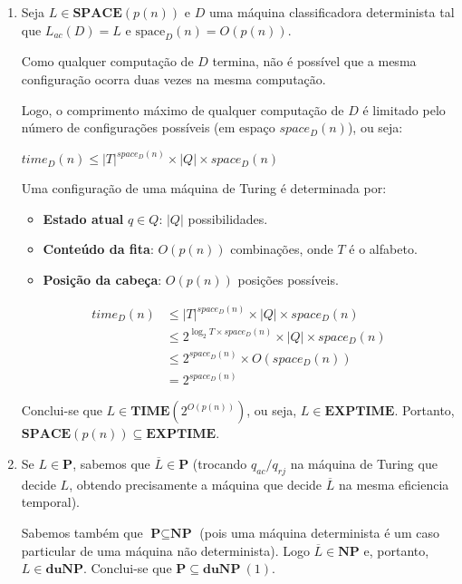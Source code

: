 \documentclass[a4paper,12pt]{article}
\begin{document}
\begin{enumerate}[label=\alph*)]
  \vspace{0.5cm}
  \item 
  Seja $L \in \textbf{SPACE}(p(n))$ e $D$ uma máquina classificadora determinista tal que $L_{ac}(D) = L$ e $\text{space}_D(n) = O(p(n))$.

  \vspace{0.3cm}
  Como qualquer computação de $D$ termina, não é possível que a mesma configuração ocorra duas vezes na mesma computação.

  \vspace{0.3cm}
  Logo, o comprimento máximo de qualquer computação de $D$ é limitado pelo número de configurações possíveis (em espaço $space_D(n)$), ou seja:
  \begin{center}
      $time_D(n) \leq |T|^{space_D(n)} \times |Q| \times space_D(n)$
  \end{center}
  Uma configuração de uma máquina de Turing é determinada por:

  \begin{itemize}
    \item \textbf{Estado atual} $ q \in Q $: $ |Q| $ possibilidades.
    \item \textbf{Conteúdo da fita}: $ O(p(n)) $ combinações, onde $ T $ é o alfabeto.
    \item \textbf{Posição da cabeça}: $ O(p(n)) $ posições possíveis.
  \end{itemize}

  \begin{align*}
    time_D(n) &\leq |T|^{space_D(n)} \times |Q| \times space_D(n) \\
    &\leq 2^{\log_2T \times space_D(n)} \times |Q| \times space_D(n) \\
    &\leq 2^{space_D(n)} \times O(space_D(n)) \\
    &= 2^{space_D(n)}
  \end{align*}

  Conclui-se que $L \in \textbf{TIME}(2^{O(p(n))})$, ou seja, $L \in \textbf{EXPTIME}$. Portanto, $\textbf{SPACE}(p(n)) \subseteq \textbf{EXPTIME}$.

  \vspace{0.5cm}
  \item Se $L \in \textbf{P}$, sabemos que $\overline{L} \in \textbf{P}$ (trocando $q_{ac}/q_{rj}$ na máquina de Turing que decide $L$, obtendo precisamente a máquina que decide $\overline{L}$ na mesma eficiencia temporal).
  
  \vspace{0.3cm}
  Sabemos também que $\textbf{P} \subseteq \textbf{NP}$ (pois uma máquina determinista é um caso particular de uma máquina não determinista). Logo $\overline{L} \in \textbf{NP}$ e, portanto, $L \in \textbf{duNP}$. Conclui-se que $\textbf{P} \subseteq \textbf{duNP} \ (1)$.


\end{enumerate}
\end{document}
